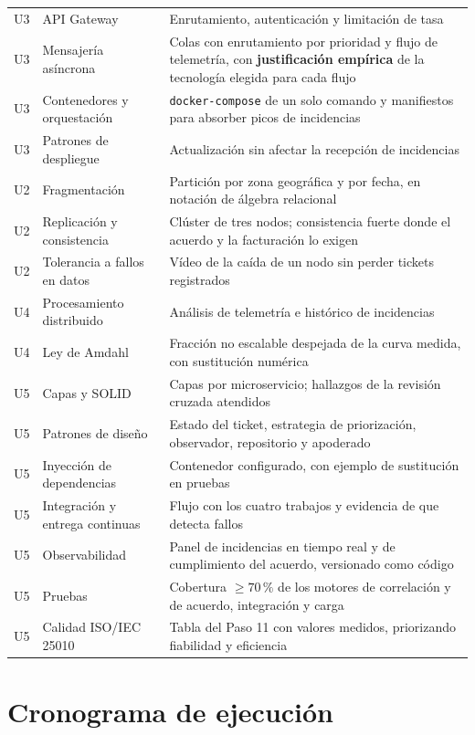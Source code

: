 \documentclass[11pt,a4paper]{article}
\begin{document}
\begin{center}
\begin{longtable}{@{}p{1.1cm}p{4.9cm}p{8.9cm}@{}}
			U3 & API Gateway & Enrutamiento, autenticación y limitación de tasa \\
			U3 & Mensajería asíncrona & Colas con enrutamiento por prioridad y flujo de telemetría, con \textbf{justificación empírica} de la tecnología elegida para cada flujo \\
			U3 & Contenedores y orquestación & \texttt{docker-compose} de un solo comando y manifiestos para absorber picos de incidencias \\
			U3 & Patrones de despliegue & Actualización sin afectar la recepción de incidencias \\
			U2 & Fragmentación & Partición por zona geográfica y por fecha, en notación de álgebra relacional \\
			U2 & Replicación y consistencia & Clúster de tres nodos; consistencia fuerte donde el acuerdo y la facturación lo exigen \\
			U2 & Tolerancia a fallos en datos & Vídeo de la caída de un nodo sin perder tickets registrados \\
			U4 & Procesamiento distribuido & Análisis de telemetría e histórico de incidencias \\
			U4 & Ley de Amdahl & Fracción no escalable despejada de la curva medida, con sustitución numérica \\
			U5 & Capas y SOLID & Capas por microservicio; hallazgos de la revisión cruzada atendidos \\
			U5 & Patrones de diseño & Estado del ticket, estrategia de priorización, observador, repositorio y apoderado \\
			U5 & Inyección de dependencias & Contenedor configurado, con ejemplo de sustitución en pruebas \\
			U5 & Integración y entrega continuas & Flujo con los cuatro trabajos y evidencia de que detecta fallos \\
			U5 & Observabilidad & Panel de incidencias en tiempo real y de cumplimiento del acuerdo, versionado como código \\
			U5 & Pruebas & Cobertura $\geq 70\,\%$ de los motores de correlación y de acuerdo, integración y carga \\
			U5 & Calidad ISO/IEC 25010 & Tabla del Paso 11 con valores medidos, priorizando fiabilidad y eficiencia \\
			\bottomrule
		\end{longtable}
	\end{center}
	
	\section{Cronograma de ejecución}
	
\end{document}

